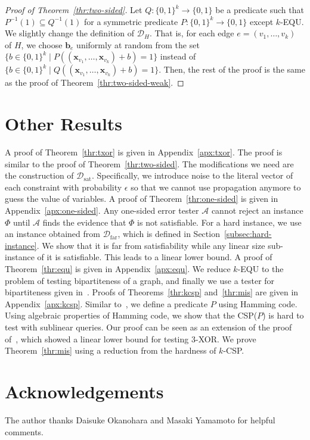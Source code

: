 \documentclass[letterpaper,11pt]{article}
\newcommand{\cald}{\mathcal{D}}
\newcommand{\caldsat}{\mathcal{D}_{\mathrm{sat}}}
\newcommand{\caldfar}{\mathcal{D}_{\mathrm{far}}}
\newcommand{\cala}{\mathcal{A}}
\newcommand{\bfx}{\mathbf{x}}
\newcommand{\bfb}{\mathbf{b}}
\newcommand{\bit}{\{0,1\}}
\newcommand{\kcsp}{\textsf{$k$-CSP}\xspace}
\newcommand{\csp}[1]{\textsf{CSP}(#1)\xspace}
\newcommand{\xor}{\textsf{XOR}\xspace}
\newcommand{\kequ}{$k$-\textsf{EQU}\xspace}
\begin{document}
\begin{proof}[Proof of Theorem~\ref{thr:two-sided}]
Let $Q:\bit^k\to\bit$ be a predicate such that $P^{-1}(1)\subseteq Q^{-1}(1)$ for a symmetric predicate $P:\bit^k\to\bit$ except \kequ.
We slightly change the definition of $\cald_H$.
That is, for each edge $e=(v_1,\ldots,v_k)$ of $H$,
we choose $\bfb_e$ uniformly at random from the set $\{b\in \bit^k\mid P((\bfx_{v_1},\ldots,\bfx_{v_k})+b)=1 \}$ instead of $\{b\in \bit^k\mid Q((\bfx_{v_1},\ldots,\bfx_{v_k})+b)=1 \}$.
Then, the rest of the proof is the same as the proof of Theorem~\ref{thr:two-sided-weak}.
\end{proof}

\section{Other Results}\label{sec:other}
A proof of Theorem~\ref{thr:txor} is given in Appendix~\ref{apx:txor}.
The proof is similar to the proof of Theorem~\ref{thr:two-sided}.
The modifications we need are the construction of $\caldsat$.
Specifically, 
we introduce noise to the literal vector of each constraint with probability $\epsilon$ so that we cannot use propagation anymore to guess the value of variables.
A proof of Theorem~\ref{thr:one-sided} is given in Appendix~\ref{apx:one-sided}.
Any one-sided error tester $\cala$ cannot reject an instance $\Phi$ until $\cala$ finds the evidence that $\Phi$ is not satisfiable.
For a hard instance, 
we use an instance obtained from $\caldfar$, which is defined in Section~\ref{subsec:hard-instance}.
We show that it is far from satisfiability while any linear size sub-instance of it is satisfiable.
This leads to a linear lower bound.
A proof of Theorem~\ref{thr:equ} is given in Appendix~\ref{apx:equ}.
We reduce \kequ to the problem of testing bipartiteness of a graph,
and finally we use a tester for bipartiteness given in~\cite{GR99}.
Proofs of Theorems~\ref{thr:kcsp} and~\ref{thr:mis} are given in Appendix~\ref{apx:kcsp}.
Similar to~\cite{Tul09}, 
we define a predicate $P$ using Hamming code.
Using algebraic properties of Hamming code, 
we show that the \csp{$P$} is hard to test with sublinear queries.
Our proof can be seen as an extension of the proof of~\cite{BOT02}, 
which showed a linear lower bound for testing $3$-\xor.
We prove Theorem~\ref{thr:mis} using a reduction from the hardness of \kcsp.

\newpage

\section*{Acknowledgements}
The author thanks Daisuke Okanohara and Masaki Yamamoto for helpful comments.
\end{document}
